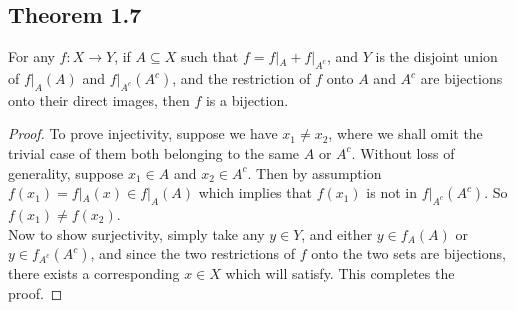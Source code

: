 \documentclass[../../main.tex]{subfiles}
\begin{document}
\subsection{Theorem 1.7}
\begin{wts}\label{theorem:piecewise bijective with disjoint ranges, implies bijective}
For any $f: X\to Y$, if $A\subseteq X$ such that $f = f|_A + f|_{A^c}$, and $Y$ is the disjoint union of $f|_A(A)$ and $f|_{A^c}(A^c)$, and the restriction of $f$ onto $A$ and $A^c$ are bijections onto their direct images, then $f$ is a bijection. 
\end{wts}
\begin{proof}
To prove injectivity, suppose we have $x_1 \neq x_2$, where we shall omit the trivial case of them both belonging to the same $A$ or $A^c$. Without loss of generality, suppose $x_1\in A$ and $x_2\in A^c$. Then by assumption $f(x_1) = f|_A(x)\in f|_A(A)$ which implies that $f(x_1)$ is not in $f|_{A^c}(A^c)$. So $f(x_1)\neq f(x_2)$.\\

Now to show surjectivity, simply take any $y\in Y$, and either $y\in f_A(A)$ or $y\in f_{A^c}(A^c)$, and since the two restrictions of $f$ onto the two sets are bijections, there exists a corresponding $x\in X$ which will satisfy. This completes the proof.
\end{proof}
\end{document}
